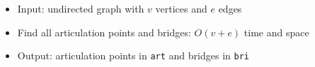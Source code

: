 \begin{itemize}
	\item Input: undirected graph with $v$ vertices and $e$ edges
	\item Find all articulation points and bridges: $O(v+e)$ time and space
	\item Output: articulation points in \lstinline{art} and bridges in \lstinline{bri}
\end{itemize}
